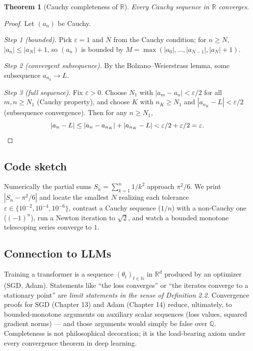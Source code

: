 \documentclass[11pt]{article}
\newtheorem{theorem}{Theorem}[section]
\theoremstyle{remark}
\begin{document}
\begin{theorem}[Cauchy completeness of $\mathbb{R}$]
Every Cauchy sequence in $\mathbb{R}$ converges.
\end{theorem}

\begin{proof}
Let $(a_n)$ be Cauchy.

\emph{Step 1 (bounded).} Pick $\varepsilon = 1$ and $N$ from the Cauchy condition; for $n \geq N$, $|a_n| \leq |a_N| + 1$, so $(a_n)$ is bounded by $M = \max(|a_0|, \ldots, |a_{N-1}|, |a_N| + 1)$.

\emph{Step 2 (convergent subsequence).} By the Bolzano--Weierstrass lemma, some subsequence $a_{n_k} \to L$.

\emph{Step 3 (full sequence).} Fix $\varepsilon > 0$. Choose $N_1$ with $|a_m - a_n| < \varepsilon/2$ for all $m, n \geq N_1$ (Cauchy property), and choose $K$ with $n_K \geq N_1$ and $|a_{n_K} - L| < \varepsilon/2$ (subsequence convergence). Then for any $n \geq N_1$,
\[
|a_n - L| \leq |a_n - a_{n_K}| + |a_{n_K} - L| < \varepsilon/2 + \varepsilon/2 = \varepsilon. \qedhere
\]
\end{proof}

\subsection*{Code sketch}

Numerically the partial sums $S_n = \sum_{k=1}^n 1/k^2$ approach $\pi^2/6$. We print $|S_n - \pi^2/6|$ and locate the smallest $N$ realizing each tolerance $\varepsilon \in \{10^{-2}, 10^{-4}, 10^{-6}\}$, contrast a Cauchy sequence ($1/n$) with a non-Cauchy one ($(-1)^n$), run a Newton iteration to $\sqrt{2}$, and watch a bounded monotone telescoping series converge to $1$.

\subsection*{Connection to LLMs}

Training a transformer is a sequence $(\theta_t)_{t \in \mathbb{N}}$ in $\mathbb{R}^d$ produced by an optimizer (SGD, Adam). Statements like ``the loss converges'' or ``the iterates converge to a stationary point'' are \emph{limit statements in the sense of Definition 2.2}. Convergence proofs for SGD (Chapter 13) and Adam (Chapter 14) reduce, ultimately, to bounded-monotone arguments on auxiliary scalar sequences (loss values, squared gradient norms) --- and those arguments would simply be false over $\mathbb{Q}$. Completeness is not philosophical decoration; it is the load-bearing axiom under every convergence theorem in deep learning.
\end{document}
